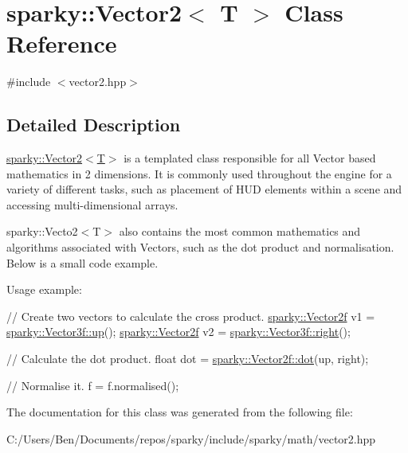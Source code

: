 \hypertarget{classsparky_1_1_vector2_3_01_t_01_4}{}\section{sparky\+:\+:Vector2$<$ T $>$ Class Reference}
\label{classsparky_1_1_vector2_3_01_t_01_4}


{\ttfamily \#include $<$vector2.\+hpp$>$}



\subsection{Detailed Description}
\hyperlink{classsparky_1_1_vector2_3_01_t_01_4}{sparky\+::\+Vector2$<$\+T$>$} is a templated class responsible for all Vector based mathematics in 2 dimensions. It is commonly used throughout the engine for a variety of different tasks, such as placement of H\+UD elements within a scene and accessing multi-\/dimensional arrays.

sparky\+::\+Vecto2$<$\+T$>$ also contains the most common mathematics and algorithms associated with Vectors, such as the dot product and normalisation. Below is a small code example.

Usage example\+: 
\begin{DoxyCode}
\textcolor{comment}{// Create two vectors to calculate the cross product.}
\hyperlink{classsparky_1_1_vector2}{sparky::Vector2f} v1 = \hyperlink{classsparky_1_1_vector3_af54c2e1458f00c76b06c61641c856c95}{sparky::Vector3f::up}();
\hyperlink{classsparky_1_1_vector2}{sparky::Vector2f} v2 = \hyperlink{classsparky_1_1_vector3_a5aa189b8cd595fdbe3fcbcfb03ad6f8e}{sparky::Vector3f::right}();

\textcolor{comment}{// Calculate the dot product.}
\textcolor{keywordtype}{float} dot = \hyperlink{classsparky_1_1_vector2_aaf94222514e04f14673540c1b5619ba1}{sparky::Vector2f::dot}(up, right);

\textcolor{comment}{// Normalise it.}
f = f.normalised();
\end{DoxyCode}
 

The documentation for this class was generated from the following file\+:\begin{DoxyCompactItemize}
\item 
C\+:/\+Users/\+Ben/\+Documents/repos/sparky/include/sparky/math/vector2.\+hpp\end{DoxyCompactItemize}
